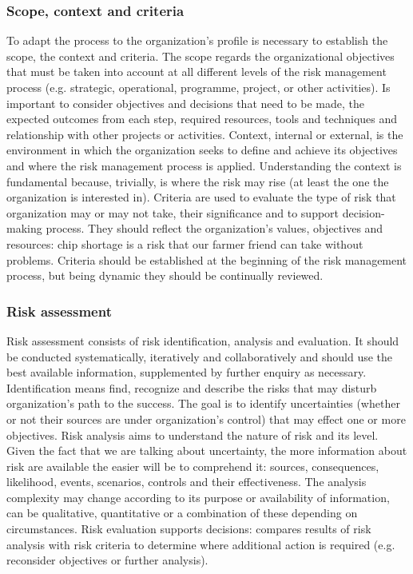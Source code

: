 \subsubsection{Scope, context and criteria}
To adapt the process to the organization's profile is necessary to establish the scope, the context and criteria.\newline
The scope regards the organizational objectives that must be taken into account at all different levels of the risk management process (e.g. strategic, operational, programme, project, or other activities). Is important to consider objectives and decisions that need to be made, the expected outcomes from each step, required resources, tools and techniques and relationship with other projects or activities.\newline
Context, internal or external, is the environment in which the organization seeks to define and achieve its objectives and where the risk management process is applied. Understanding the context is fundamental because, trivially, is where the risk may rise (at least the one the organization is interested in).\newline
Criteria are used to evaluate the type of risk that organization may or may not take, their significance and to support decision-making process. They should reflect the organization's values, objectives and resources: chip shortage is a risk that our farmer friend can take without problems. Criteria should be established at the beginning of the risk management process, but being dynamic they should be continually reviewed.
\subsubsection{Risk assessment}
Risk assessment consists of risk identification, analysis and evaluation. It should be conducted systematically, iteratively and collaboratively and should use the best available information, supplemented by further enquiry as necessary.\newline
Identification means find, recognize and describe the risks that may disturb organization's path to the success. The goal is to identify uncertainties (whether or not their sources are under organization's control) that may effect one or more objectives.\newline
Risk analysis aims to understand the nature of risk and its level. Given the fact that we are talking about uncertainty, the more information about risk are available the easier will be to comprehend it: sources, consequences, likelihood, events, scenarios, controls and their effectiveness. The analysis complexity may change according to its purpose or availability of information, can be qualitative, quantitative or a combination of these depending on circumstances.\newline
Risk evaluation supports decisions: compares results of risk analysis with risk criteria to determine where additional action is required (e.g. reconsider objectives or further analysis).
